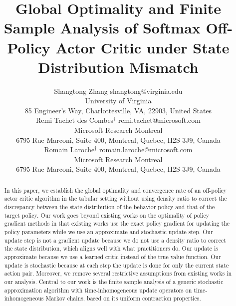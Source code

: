 \documentclass[twoside,11pt]{article}
\numberwithin{assucounter}{section}
\begin{document}
\title{Global Optimality and Finite Sample Analysis of Softmax Off-Policy Actor Critic under State Distribution Mismatch}

\author{\name Shangtong Zhang \email shangtong@virginia.edu \\
  \addr University of Virginia\\
  85 Engineer's Way, Charlottesville, VA, 22903, United States\\
  \name Remi Tachet des Combes$^\dagger$
  \email remi.tachet@microsoft.com \\
  \addr Microsoft Research Montreal \\
  6795 Rue Marconi, Suite 400, Montreal, Quebec, H2S 3J9, Canada \\
  \name Romain Laroche$^\dagger$ \email romain.laroche@microsoft.com \\
  \addr Microsoft Research Montreal \\
  6795 Rue Marconi, Suite 400, Montreal, Quebec, H2S 3J9, Canada
  }


\maketitle

\begin{abstract}%
  In this paper,
  we establish the global optimality and convergence rate of an off-policy actor critic algorithm in the tabular setting without using density ratio to correct the discrepancy between the state distribution of the behavior policy and that of the target policy.
  Our work goes beyond existing works on the optimality of policy gradient methods in that
  existing works use the exact policy gradient for updating the policy parameters 
  while we use an approximate and stochastic update step.
  Our update step is not a gradient update because we do not use a density ratio to correct the state distribution,
  which aligns well with what practitioners do.
  Our update is approximate because we use a learned critic instead of the true value function.
  Our update is stochastic because at each step the update is done for only the current state action pair.
  Moreover,
  we remove several restrictive assumptions from existing works in our analysis.
  Central to our work is the finite sample analysis of a generic stochastic approximation algorithm with time-inhomogeneous update operators on time-inhomogeneous Markov chains,
  based on its uniform contraction properties.
  \let\svthefootnote\thefootnote
  \let\thefootnote\relax{}
  \let\thefootnote\svthefootnote
\end{abstract}
\end{document}
